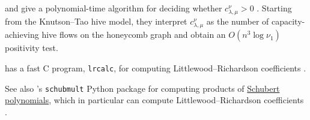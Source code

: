  and 
give a polynomial-time algorithm for deciding whether
$c^\nu_{\lambda,\mu}>0$ \cite{BurgisserIkenmeyer2013}.  Starting from the
Knutson--Tao hive model, they interpret $c^\nu_{\lambda,\mu}$ as the number
of capacity-achieving hive flows on the honeycomb graph and obtain an
$O(n^3\log \nu_1)$ positivity test.

 has a fast C program, \texttt{lrcalc}, for computing
Littlewood--Richardson coefficients \cite{BuchLRCalc}.

See also 's \texttt{schubmult} Python package for
computing products of \hyperref[schubert]{Schubert polynomials}, which in
particular can compute Littlewood--Richardson coefficients
\cite{SamuelSchubmult}.
